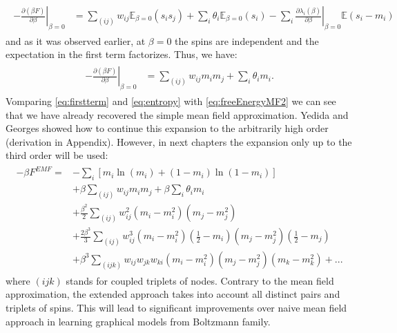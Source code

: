 \documentclass[../report/report.tex]{subfiles}
\begin{document}
\begin{align}
\begin{split}
 - \left. \frac{\partial (\beta F)}{\partial \beta}\right|_{\beta = 0} & =  \sum_{(ij)} w_{ij} \mathbb{E}_{\beta =0}(s_i s_j) + \sum_i \theta_i \mathbb{E}_{\beta =0}(s_i) - \sum_i  \left.\frac{\partial\lambda_i (\beta)}{\partial \beta}\right|_{\beta = 0}\mathbb{E}(s_i - m_i) 
 \end{split}
\end{align}
and as it was observed earlier, at $\beta =0$ the spins are independent and the expectation in the first term factorizes. Thus, we have:
\begin{align}
\begin{split}
 - \left. \frac{\partial (\beta F)}{\partial \beta}\right|_{\beta = 0} & =  \sum_{(ij)} w_{ij} m_i m_j +  \sum_i \theta_i m_i.
 \label{eq:firstterm} 
 \end{split}
\end{align}
Vomparing \ref{eq:firstterm} and \ref{eq:entropy} with \ref{eq:freeEnergyMF2} we can see that we have already recovered the simple mean field approximation. Yedida and Georges \cite{georges1991expand} showed how to continue this expansion to the arbitrarily high order (derivation in Appendix). However, in next chapters the expansion only up to the third order will be used:
\begin{align*}
\begin{split}
-\beta F^{EMF} = & - \sum_i \left[m_i\ln (m_i) +  (1 - m_i)\ln \left( 1-m_i \right)\right]  \\
& + \beta \sum_{(ij)} w_{ij} m_i m_j + \beta \sum_i \theta_i m_i\\
& + \frac{\beta^2}{2} \sum_{(ij)} w_{ij}^2 (m_i - m_i^2)(m_j-m_j^2)\\
& + \frac{2\beta^3}{3} \sum_{(ij)} w_{ij}^3 (m_i - m_i^2)(\frac{1}{2} - m_i)(m_j - m_j^2)(\frac{1}{2} - m_j)\\
& +\beta^3 \sum_{(ijk)} w_{ij}w_{jk}w_{ki} (m_i - m_i^2)(m_j - m_j^2)(m_k - m_k^2) + ...
\label{eq:EMFexpansion}
\end{split}
\end{align*}
where $(ijk)$ stands for coupled triplets of nodes. Contrary to the mean field approximation, the extended approach takes into account all distinct pairs and triplets of spins. This will lead to significant improvements over naive mean field approach
in learning graphical models from Boltzmann family.

\end{document}

